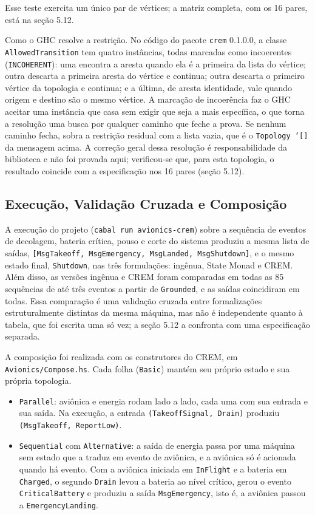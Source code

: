 \documentclass[12pt,a4paper]{article}
\begin{document}
Esse teste exercita um único par de vértices; a matriz completa, com os 16 pares, está na seção 5.12.

Como o GHC resolve a restrição. No código do pacote \texttt{crem} 0.1.0.0, a classe \texttt{AllowedTransition} tem quatro instâncias, todas marcadas como incoerentes (\texttt{INCOHERENT}): uma encontra a aresta quando ela é a primeira da lista do vértice; outra descarta a primeira aresta do vértice e continua; outra descarta o primeiro vértice da topologia e continua; e a última, de aresta identidade, vale quando origem e destino são o mesmo vértice. A marcação de incoerência faz o GHC aceitar uma instância que casa sem exigir que seja a mais específica, o que torna a resolução uma busca por qualquer caminho que feche a prova. Se nenhum caminho fecha, sobra a restrição residual com a lista vazia, que é o \texttt{Topology '[]} da mensagem acima. A correção geral dessa resolução é responsabilidade da biblioteca e não foi provada aqui; verificou-se que, para esta topologia, o resultado coincide com a especificação nos 16 pares (seção 5.12).

\subsection{Execução, Validação Cruzada e Composição}

A execução do projeto (\texttt{cabal run avionics-crem}) sobre a sequência de eventos de decolagem, bateria crítica, pouso e corte do sistema produziu a mesma lista de saídas, \texttt{[MsgTakeoff, MsgEmergency, MsgLanded, MsgShutdown]}, e o mesmo estado final, \texttt{Shutdown}, nas três formulações: ingênua, State Monad e CREM. Além disso, as versões ingênua e CREM foram comparadas em todas as 85 sequências de até três eventos a partir de \texttt{Grounded}, e as saídas coincidiram em todas. Essa comparação é uma validação cruzada entre formalizações estruturalmente distintas da mesma máquina, mas não é independente quanto à tabela, que foi escrita uma só vez; a seção 5.12 a confronta com uma especificação separada.

A composição foi realizada com os construtores do CREM, em \texttt{Avionics/Compose.hs}. Cada folha (\texttt{Basic}) mantém seu próprio estado e sua própria topologia.

\begin{itemize}
\item \texttt{Parallel}: aviônica e energia rodam lado a lado, cada uma com sua entrada e sua saída. Na execução, a entrada \texttt{(TakeoffSignal, Drain)} produziu \texttt{(MsgTakeoff, ReportLow)}.
\item \texttt{Sequential} com \texttt{Alternative}: a saída de energia passa por uma máquina sem estado que a traduz em evento de aviônica, e a aviônica só é acionada quando há evento. Com a aviônica iniciada em \texttt{InFlight} e a bateria em \texttt{Charged}, o segundo \texttt{Drain} levou a bateria ao nível crítico, gerou o evento \texttt{CriticalBattery} e produziu a saída \texttt{MsgEmergency}, isto é, a aviônica passou a \texttt{EmergencyLanding}.
\end{itemize}
\end{document}
